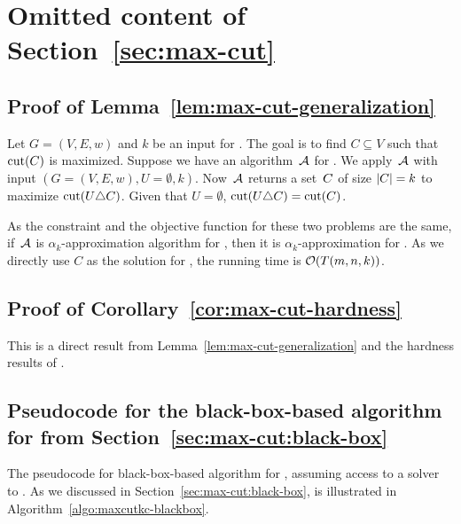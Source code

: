 \section{Omitted content of Section~\ref{sec:max-cut}}
\label{appendix:mc-proofs}


\subsection{Proof of Lemma~\ref{lem:max-cut-generalization}} 
Let $G=(V,E,w)$ and $k$ be an input for \ccmaxcut. The goal is to find $C \subseteq V$ such that $\cut{C}$ is maximized. 
Suppose we have an algorithm~$\mathcal{A}$ for \maxcutkc. We apply~$\mathcal{A}$ with input $(G = (V, E, w), U=\emptyset, k)$. 
Now~$\mathcal{A}$ returns a set~$C$ of size $|C|=k$ to maximize $\cut{U \symm C}$.
Given that $U=\emptyset$, $\cut{U \symm C} = \cut{C}$.

As the constraint and the objective function for these two problems are the same, if~$\mathcal{A}$ is $\alpha_{k}$-approximation algorithm for \maxcutkc, then it is $\alpha_{k}$-approximation for \ccmaxcut. 
As we directly use $C$ as the solution for \ccmaxcut, the running time is $\mathcal{O}(T(m,n, k))$. 

\subsection{Proof of Corollary~\ref{cor:max-cut-hardness}}
This is a direct result from Lemma~\ref{lem:max-cut-generalization} and the
hardness results of \cite{DBLP:conf/approx/AustrinS19}.

\subsection{Pseudocode for the black-box-based algorithm for \maxcutkc from Section~\ref{sec:max-cut:black-box}}
\label{appendix:maxcutkc:blackbox:pseudocode}

The pseudocode for black-box-based algorithm for \maxcutkc, assuming access to a solver to \maxcut. As we discussed in Section~\ref{sec:max-cut:black-box}, is illustrated in Algorithm~\ref{algo:maxcutkc-blackbox}.

